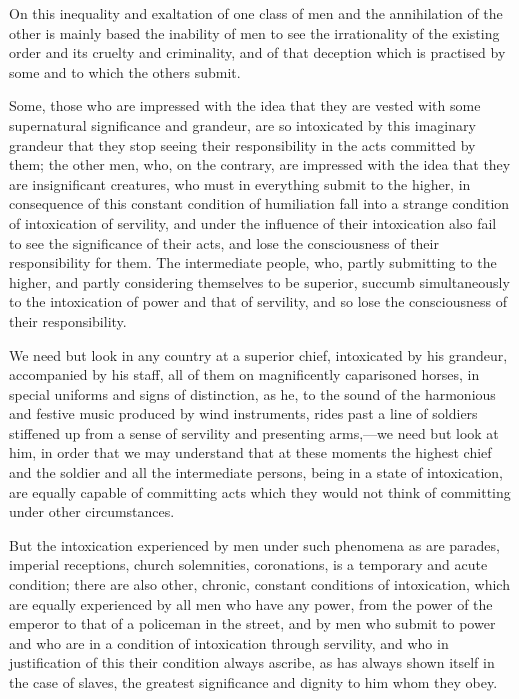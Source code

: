 \documentclass{book}
\begin{document}
On this inequality and exaltation of one class of men and the annihilation of the other is mainly based the inability of men to see the irrationality of the existing order and its cruelty and criminality, and of that deception which is practised by some and to which the others submit.

Some, those who are impressed with the idea that they are vested with some supernatural significance and grandeur, are so intoxicated by this imaginary grandeur that they stop seeing their responsibility in the acts committed by them; the other men, who, on the contrary, are impressed with the idea that they are insignificant creatures, who must in everything submit to the higher, in consequence of this constant condition of humiliation fall into a strange condition of intoxication of servility, and under the influence of their intoxication also fail to see the significance of their acts, and lose the consciousness of their responsibility for them. The intermediate people, who, partly submitting to the higher, and partly considering themselves to be superior, succumb simultaneously to the intoxication of power and that of servility, and so lose the consciousness of their responsibility.

We need but look in any country at a superior chief, intoxicated by his grandeur, accompanied by his staff, all of them on magnificently caparisoned horses, in special uniforms and signs of distinction, as he, to the sound of the harmonious and festive music produced by wind instruments, rides past a line of soldiers stiffened up from a sense of servility and presenting arms,—we need but look at him, in order that we may understand that at these moments the highest chief and the soldier and all the intermediate persons, being in a state of intoxication, are equally capable of committing acts which they would not think of committing under other circumstances.

But the intoxication experienced by men under such phenomena as are parades, imperial receptions, church solemnities, coronations, is a temporary and acute condition; there are also other, chronic, constant conditions of intoxication, which are equally experienced by all men who have any power, from the power of the emperor to that of a policeman in the street, and by men who submit to power and who are in a condition of intoxication through servility, and who in justification of this their condition always ascribe, as has always shown itself in the case of slaves, the greatest significance and dignity to him whom they obey.
\end{document}
